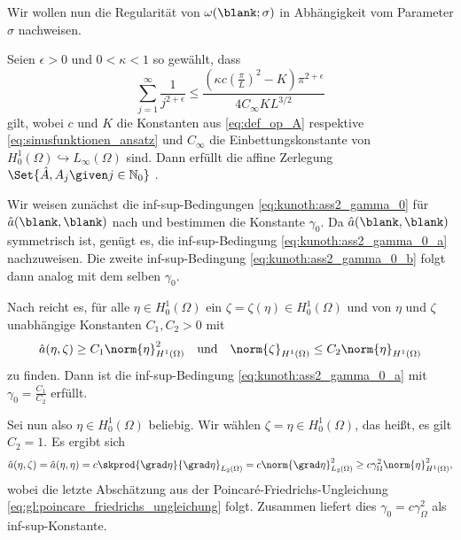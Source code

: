 Wir wollen nun die Regularität von $\omega(\blank; \sigma)$ in Abhängigkeit vom Parameter $\sigma$ nachweisen.

\begin{Satz}
\label{satz:regularitaet_nachrechnen}
    Seien $\epsilon > 0$ und $0 < \kappa < 1$ so gewählt, dass
    \begin{equation}
        \sum_{j = 1}^{\infty} \frac{1}{j^{2 + \epsilon}} \leq \frac{(\kappa c (\tfrac{\pi}{L})^{2} - K) \pi^{2 + \epsilon}}{4 C_{\infty} K L^{3/2}}
    \end{equation}
    gilt,
    wobei $c$ und $K$ die Konstanten aus \cref{eq:def_op_A} respektive \cref{eq:sinusfunktionen_ansatz} und $C_{\infty}$ die Einbettungskonstante von $H^{1}_{0}(\Omega) \hookrightarrow L_{\infty}(\Omega)$ sind.
    Dann erfüllt die affine Zerlegung $\Set{\hat A, A_{j} \given j \in \mathbb{N}_{0}}$ .

    \begin{Beweis}
        Wir weisen zunächst die inf-sup-Bedingungen \cref{eq:kunoth:ass2_gamma_0} für $\hat a(\blank, \blank)$ nach und bestimmen die Konstante $\gamma_{0}$.
        Da $\hat a(\blank, \blank)$ symmetrisch ist, genügt es, die inf-sup-Bedingung \cref{eq:kunoth:ass2_gamma_0_a} nachzuweisen. Die zweite inf-sup-Bedingung \cref{eq:kunoth:ass2_gamma_0_b} folgt dann analog mit dem selben $\gamma_{0}$.

        Nach  reicht es, für alle $\eta \in H^{1}_{0}(\Omega)$ ein $\zeta = \zeta(\eta) \in H^{1}_{0}(\Omega)$ und von $\eta$ und $\zeta$ unabhängige Konstanten $C_{1}, C_{2} > 0$ mit
        \begin{equation}
            \hat a(\eta, \zeta) \geq C_{1} \norm{\eta}_{H^{1}(\Omega)}^{2} \quad \text{und} \quad \norm{\zeta}_{H^{1}(\Omega)} \leq C_{2} \norm{\eta}_{H^{1}(\Omega)}
        \end{equation}
        zu finden.
        Dann ist die inf-sup-Bedingung \cref{eq:kunoth:ass2_gamma_0_a} mit $\gamma_{0} = \frac{C_{1}}{C_{2}}$ erfüllt.

        Sei nun also $\eta \in H^{1}_{0}(\Omega)$ beliebig.
        Wir wählen $\zeta = \eta \in H^{1}_{0}(\Omega)$, das heißt, es gilt $C_{2} = 1$.
        Es ergibt sich
        \begin{align}
            \hat a(\eta, \zeta) = \hat a(\eta, \eta) = c \skprod{\grad \eta}{\grad \eta}_{L_{2}(\Omega)} = c \norm{\grad \eta}_{L_{2}(\Omega)}^{2} \geq c \gamma_{\Omega}^{2} \norm{\eta}_{H^{1}(\Omega)}^{2},
        \end{align}
        wobei die letzte Abschätzung aus der Poincaré-Friedrichs-Ungleichung \cref{eq:gl:poincare_friedrichs_ungleichung} folgt.
        Zusammen liefert dies $\gamma_{0} = c \gamma_{\Omega}^{2}$ als inf-sup-Konstante.


\end{Beweis}
\end{Satz}
